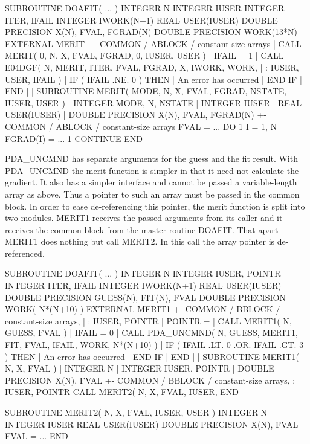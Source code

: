 \documentclass[11pt,twoside,nolof]{starlink}
\begin{document}
\begin{terminalv}
      SUBROUTINE DOAFIT( ... )
      INTEGER N
      INTEGER IUSER
      INTEGER ITER, IFAIL
      INTEGER IWORK(N+1)
      REAL USER(IUSER)
      DOUBLE PRECISION X(N), FVAL, FGRAD(N)
      DOUBLE PRECISION WORK(13*N)
      EXTERNAL MERIT
  +-  COMMON / ABLOCK / constant-size arrays
  |   CALL MERIT( 0, N, X, FVAL, FGRAD, 0, IUSER, USER )
  |   IFAIL = 1
  |   CALL E04DGF( N, MERIT, ITER, FVAL, FGRAD, X, IWORK, WORK,
  |  :   IUSER, USER, IFAIL )
  |   IF ( IFAIL .NE. 0 ) THEN
  |      An error has occurred
  |   END IF
  |   END
  |
  |   SUBROUTINE MERIT( MODE, N, X, FVAL, FGRAD, NSTATE, IUSER, USER )
  |   INTEGER MODE, N, NSTATE
  |   INTEGER IUSER
  |   REAL USER(IUSER)
  |   DOUBLE PRECISION X(N), FVAL, FGRAD(N)
  +-  COMMON / ABLOCK / constant-size arrays
      FVAL = ...
      DO 1 I = 1, N
         FGRAD(I) = ...
    1 CONTINUE
      END
\end{terminalv}

   PDA\_UNCMND has separate arguments for the guess and the fit result.
   With PDA\_UNCMND the merit function is simpler in that it need not
   calculate the gradient. It also has a simpler interface and cannot be
   passed a variable-length array as above. Thus a pointer to such an
   array must be passed in the common block. In order to ease
   de-referencing this pointer, the merit function is split into two
   modules. MERIT1 receives the passed arguments from its caller and it
   receives the common block from the master routine DOAFIT. That apart
   MERIT1 does nothing but call MERIT2. In this call the array pointer
   is de-referenced.

\begin{terminalv}
      SUBROUTINE DOAFIT( ... )
      INTEGER N
      INTEGER IUSER, POINTR
      INTEGER ITER, IFAIL
      INTEGER IWORK(N+1)
      REAL USER(IUSER)
      DOUBLE PRECISION GUESS(N), FIT(N), FVAL
      DOUBLE PRECISION WORK( N*(N+10) )
      EXTERNAL MERIT1
  +-  COMMON / BBLOCK / constant-size arrays,
  |  :                  IUSER, POINTR
  |   POINTR = %
  |   CALL MERIT1( N, GUESS, FVAL )
  |   IFAIL = 0
  |   CALL PDA_UNCMND( N, GUESS, MERIT1, FIT, FVAL, IFAIL, WORK, N*(N+10) )
  |   IF ( IFAIL .LT. 0 .OR. IFAIL .GT. 3 ) THEN
  |      An error has occurred
  |   END IF
  |   END
  |
  |   SUBROUTINE MERIT1( N, X, FVAL )
  |   INTEGER N
  |   INTEGER IUSER, POINTR
  |   DOUBLE PRECISION X(N), FVAL
  +-  COMMON / BBLOCK / constant-size arrays,
     :                  IUSER, POINTR
      CALL MERIT2( N, X, FVAL, IUSER, %
      END

      SUBROUTINE MERIT2( N, X, FVAL, IUSER, USER )
      INTEGER N
      INTEGER IUSER
      REAL USER(IUSER)
      DOUBLE PRECISION X(N), FVAL
      FVAL = ...
      END
\end{terminalv}
\end{document}
